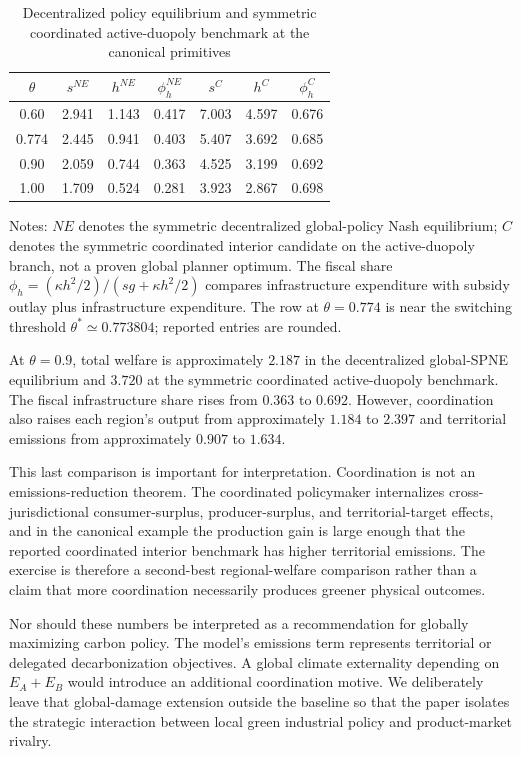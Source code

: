 \begin{table}[htbp]
\centering
\small
\caption{Decentralized policy equilibrium and symmetric coordinated active-duopoly benchmark at the canonical primitives}
\label{tab:welfare}
\begin{tabular}{ccccccc}
\toprule
$\theta$ & $s^{NE}$ & $h^{NE}$ & $\phi_h^{NE}$ & $s^{C}$ & $h^{C}$ & $\phi_h^{C}$\\
\midrule
0.60 & 2.941 & 1.143 & 0.417 & 7.003 & 4.597 & 0.676\\
0.774 & 2.445 & 0.941 & 0.403 & 5.407 & 3.692 & 0.685\\
0.90 & 2.059 & 0.744 & 0.363 & 4.525 & 3.199 & 0.692\\
1.00 & 1.709 & 0.524 & 0.281 & 3.923 & 2.867 & 0.698\\
\bottomrule
\end{tabular}
\begin{flushleft}\footnotesize
Notes: $NE$ denotes the symmetric decentralized global-policy Nash equilibrium; $C$ denotes the symmetric coordinated interior candidate on the active-duopoly branch, not a proven global planner optimum. The fiscal share $\phi_h=(\kappa h^2/2)/(sg+\kappa h^2/2)$ compares infrastructure expenditure with subsidy outlay plus infrastructure expenditure. The row at $\theta=0.774$ is near the switching threshold $\theta^*\simeq0.773804$; reported entries are rounded.
\end{flushleft}
\end{table}

At $\theta=0.9$, total welfare is approximately $2.187$ in the decentralized global-SPNE equilibrium and $3.720$ at the symmetric coordinated active-duopoly benchmark. The fiscal infrastructure share rises from $0.363$ to $0.692$. However, coordination also raises each region's output from approximately $1.184$ to $2.397$ and territorial emissions from approximately $0.907$ to $1.634$.

This last comparison is important for interpretation. Coordination is not an emissions-reduction theorem. The coordinated policymaker internalizes cross-jurisdictional consumer-surplus, producer-surplus, and territorial-target effects, and in the canonical example the production gain is large enough that the reported coordinated interior benchmark has higher territorial emissions. The exercise is therefore a second-best regional-welfare comparison rather than a claim that more coordination necessarily produces greener physical outcomes.

Nor should these numbers be interpreted as a recommendation for globally maximizing carbon policy. The model's emissions term represents territorial or delegated decarbonization objectives. A global climate externality depending on $E_A+E_B$ would introduce an additional coordination motive. We deliberately leave that global-damage extension outside the baseline so that the paper isolates the strategic interaction between local green industrial policy and product-market rivalry.
